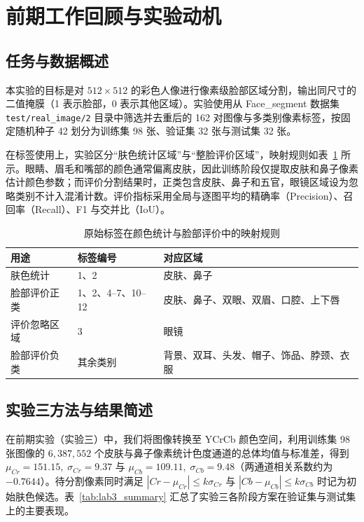 \section{前期工作回顾与实验动机}\label{sec:intro}

\subsection{任务与数据概述}

本实验的目标是对 $512\times512$ 的彩色人像进行像素级脸部区域分割，输出同尺寸的二值掩膜（1 表示脸部，0 表示其他区域）。实验使用从 Face\_segment 数据集 \texttt{test/real\_image/2} 目录中筛选并去重后的 162 对图像与多类别像素标签，按固定随机种子 42 划分为训练集 98 张、验证集 32 张与测试集 32 张。

在标签使用上，实验区分“肤色统计区域”与“整脸评价区域”，映射规则如表~\ref{tab:labels} 所示。眼睛、眉毛和嘴部的颜色通常偏离皮肤，因此训练阶段仅提取皮肤和鼻子像素估计颜色参数；而评价分割结果时，正类包含皮肤、鼻子和五官，眼镜区域设为忽略类别不计入混淆计数。评价指标采用全局与逐图平均的精确率（Precision）、召回率（Recall）、F1 与交并比（IoU）。

\begin{table}[H]
\centering\small
\caption{原始标签在颜色统计与脸部评价中的映射规则}\label{tab:labels}
\begin{tabularx}{\textwidth}{l l X}
\toprule
用途 & 标签编号 & 对应区域 \\
\midrule
肤色统计 & 1、2 & 皮肤、鼻子 \\
脸部评价正类 & 1、2、4--7、10--12 & 皮肤、鼻子、双眼、双眉、口腔、上下唇 \\
评价忽略区域 & 3 & 眼镜 \\
脸部评价负类 & 其余类别 & 背景、双耳、头发、帽子、饰品、脖颈、衣服 \\
\bottomrule
\end{tabularx}
\end{table}

\subsection{实验三方法与结果简述}

在前期实验（实验三）中，我们将图像转换至 YCrCb 颜色空间，利用训练集 98 张图像的 $6{,}387{,}552$ 个皮肤与鼻子像素统计色度通道的总体均值与标准差，得到 $\mu_{Cr}=151.15,\;\sigma_{Cr}=9.37$ 与 $\mu_{Cb}=109.11,\;\sigma_{Cb}=9.48$（两通道相关系数约为 $-0.7644$）。待分割像素同时满足 $|Cr-\mu_{Cr}|\le k\sigma_{Cr}$ 与 $|Cb-\mu_{Cb}|\le k\sigma_{Cb}$ 时记为初始肤色候选。表~\ref{tab:lab3_summary} 汇总了实验三各阶段方案在验证集与测试集上的主要表现。

